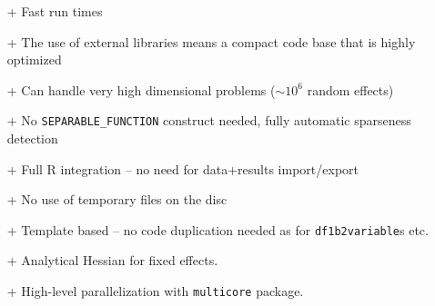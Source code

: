 \documentclass[compress]{beamer}
\begin{document}
\begin{frame}
  \begin{itemize}
    \item[+] Fast run times
    \item[+] The use of external libraries means a compact code base that is highly optimized
    \item[+] Can handle very high dimensional problems ($\sim 10^6$ random effects)
    \item[+] No \texttt{SEPARABLE\_FUNCTION} construct needed, fully automatic sparseness detection
    \item[+] Full R integration -- no need for data+results import/export
    \item[+] No use of temporary files on the disc
    \item[+] Template based -- no code duplication needed as for \texttt{df1b2variable}s etc.
    \item[+] Analytical Hessian for fixed effects.
    \item[+] High-level parallelization with \texttt{multicore} package. 
  \end{itemize}
\end{frame}
\end{document}
